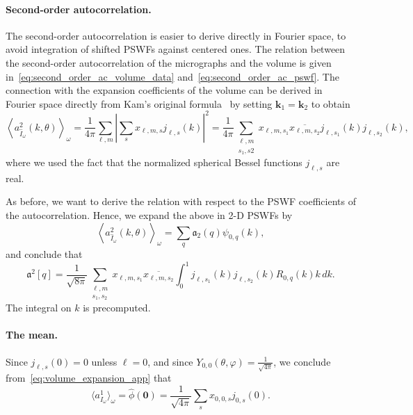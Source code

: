 \documentclass[english,11pt]{article}
\newcommand{\1}{\mathbf{1}}
\newcommand{\mb}{\mathbf}
\newcommand{\TODO}[1]{{\color{red}{[#1]}}}
\numberwithin{equation}{section}
\theoremstyle{plain}
\theoremstyle{definition}
\theoremstyle{remark}
\theoremstyle{plain}
\theoremstyle{remark}
\theoremstyle{plain}
\theoremstyle{plain}
\newcommand{\tamir}{x}
\begin{document}
\paragraph{Second-order autocorrelation.}
The second-order autocorrelation is easier to derive directly in Fourier space, to avoid integration of shifted PSWFs against centered ones. 
The relation between the second-order autocorrelation of the micrographs and the volume is given in~\eqref{eq:second_order_ac_volume_data} and~\eqref{eq:second_order_ac_pswf}. 
The connection with the expansion coefficients of the volume can be derived in  Fourier space directly from Kam's
original formula~\cite{kam1980reconstruction} by setting $\mb k_1 = \mb k_2$ to
obtain
\[ \left\langle a^2_{\hat{I}_{\omega}}(k,\theta)\right\rangle_{\omega} =
\frac{1}{4\pi}\sum_{\ell,
	m}\left|\sum_s\tamir_{\ell,m,s}j_{\ell,s}(k)\right|^2 =
\frac{1}{4\pi}\sum_{\substack{\ell,m\\s_1,s2}}\tamir_{\ell,m,s_1}\overline{\tamir_{\ell,m,s_2}}j_{\ell,s_1}(k)j_{\ell,s_2}(k),\]
where we used the fact that the normalized spherical Bessel functions
$j_{\ell,s}$ are real. 

As before, we want to derive the relation with respect to the PSWF coefficients of the autocorrelation. Hence,  we expand the above in 2-D PSWFs by
\[\left\langle a^2_{\hat{I}_{\omega}}(k,\theta)\right\rangle_{\omega} =
\sum_{q}\mathfrak{a}_2(q)\psi_{0,q}(k),\]
and conclude that
\[ \mathfrak{a}^2[q] =
\frac{1}{\sqrt{8\pi}}\sum_{\substack{\ell,m\\s_1,s_2}}\tamir_{\ell,m,s_1}\overline{\tamir_{\ell,m,s_2}}
\int_0^1j_{\ell,s_1}(k)j_{\ell,s_2}(k)R_{0,q}(k)k\, dk.\]
The integral on $k$ is precomputed.

\paragraph{The mean.}

Since $j_{\ell,s}(0) = 0$ unless $\ell=0$, and since
$Y_{0,0}(\theta,\varphi) = \frac{1}{\sqrt{4\pi}}$, we conclude from~\eqref{eq:volume_expansion_app} that
\[ \langle
a^1_{I_{\omega}}\rangle_{\omega} = \widehat \phi(\mb 0) = \frac{1}{\sqrt{4\pi}}\sum_s\tamir_{0,0,s}j_{0,s}(0).\]


\TODO{=========== Tamir: Stopped here ===============}
\end{document}
